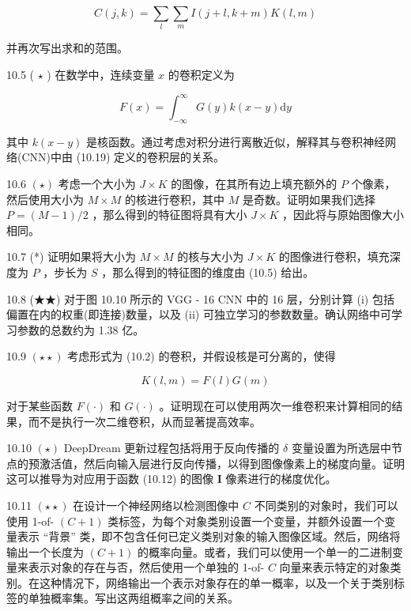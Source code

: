 \documentclass[10pt]{report}
\begin{document}
\[
C\left( {j,k}\right)  = \mathop{\sum }\limits_{l}\mathop{\sum }\limits_{m}I\left( {j + l,k + m}\right) K\left( {l,m}\right)  \tag{10.20}
\]

并再次写出求和的范围。

10.5 ( \(\star\) ) 在数学中，连续变量 \(x\) 的卷积定义为

\[
F\left( x\right)  = {\int }_{-\infty }^{\infty }G\left( y\right) k\left( {x - y}\right) \mathrm{d}y \tag{10.21}
\]

其中 \(k\left( {x - y}\right)\) 是核函数。通过考虑对积分进行离散近似，解释其与卷积神经网络(CNN)中由 (10.19) 定义的卷积层的关系。

10.6 \(\left( \star \right)\) 考虑一个大小为 \(J \times  K\) 的图像，在其所有边上填充额外的 \(P\) 个像素，然后使用大小为 \(M \times  M\) 的核进行卷积，其中 \(M\) 是奇数。证明如果我们选择 \(P = \left( {M - 1}\right) /2\) ，那么得到的特征图将具有大小 \(J \times  K\) ，因此将与原始图像大小相同。

10.7 (*) 证明如果将大小为 \(M \times  M\) 的核与大小为 \(J \times  K\) 的图像进行卷积，填充深度为 \(P\) ，步长为 \(S\) ，那么得到的特征图的维度由 (10.5) 给出。

10.8 (★★) 对于图 10.10 所示的 VGG - 16 CNN 中的 16 层，分别计算 (i) 包括偏置在内的权重(即连接)数量，以及 (ii) 可独立学习的参数数量。确认网络中可学习参数的总数约为 1.38 亿。

10.9 \(\left( {\star  \star  }\right)\) 考虑形式为 (10.2) 的卷积，并假设核是可分离的，使得

\[
K\left( {l,m}\right)  = F\left( l\right) G\left( m\right)  \tag{10.22}
\]

对于某些函数 \(F\left( \cdot \right)\) 和 \(G\left( \cdot \right)\) 。证明现在可以使用两次一维卷积来计算相同的结果，而不是执行一次二维卷积，从而显著提高效率。

10.10 \(\left( \star \right)\) DeepDream 更新过程包括将用于反向传播的 \(\delta\) 变量设置为所选层中节点的预激活值，然后向输入层进行反向传播，以得到图像像素上的梯度向量。证明这可以推导为对应用于函数 (10.12) 的图像 \(\mathbf{I}\) 像素进行的梯度优化。

10.11 \(\left( {\star  \star  }\right)\) 在设计一个神经网络以检测图像中 \(C\) 不同类别的对象时，我们可以使用 1-of- \(\left( {C + 1}\right)\) 类标签，为每个对象类别设置一个变量，并额外设置一个变量表示 “背景” 类，即不包含任何已定义类别对象的输入图像区域。然后，网络将输出一个长度为 \(\left( {C + 1}\right)\) 的概率向量。或者，我们可以使用一个单一的二进制变量来表示对象的存在与否，然后使用一个单独的 1-of- \(C\) 向量来表示特定的对象类别。在这种情况下，网络输出一个表示对象存在的单一概率，以及一个关于类别标签的单独概率集。写出这两组概率之间的关系。
\end{document}
